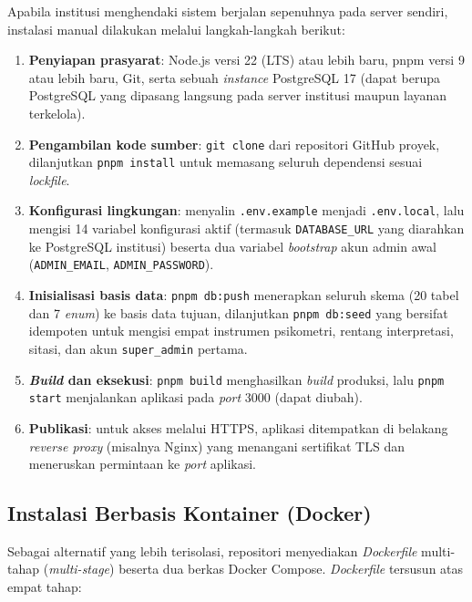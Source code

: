 Apabila institusi menghendaki sistem berjalan sepenuhnya pada server sendiri, instalasi manual dilakukan melalui langkah-langkah berikut:

\begin{enumerate}[leftmargin=2cm]
  \item \textbf{Penyiapan prasyarat}: Node.js versi 22 (LTS) atau lebih baru, pnpm versi 9 atau lebih baru, Git, serta sebuah \textit{instance} PostgreSQL 17 (dapat berupa PostgreSQL yang dipasang langsung pada server institusi maupun layanan terkelola).
  \item \textbf{Pengambilan kode sumber}: \texttt{git clone} dari repositori GitHub proyek, dilanjutkan \texttt{pnpm install} untuk memasang seluruh dependensi sesuai \textit{lockfile}.
  \item \textbf{Konfigurasi lingkungan}: menyalin \texttt{.env.example} menjadi \texttt{.env.local}, lalu mengisi 14 variabel konfigurasi aktif (termasuk \texttt{DATABASE\_URL} yang diarahkan ke PostgreSQL institusi) beserta dua variabel \textit{bootstrap} akun admin awal (\texttt{ADMIN\_EMAIL}, \texttt{ADMIN\_PASSWORD}).
  \item \textbf{Inisialisasi basis data}: \texttt{pnpm db:push} menerapkan seluruh skema (20 tabel dan 7 \textit{enum}) ke basis data tujuan, dilanjutkan \texttt{pnpm db:seed} yang bersifat idempoten untuk mengisi empat instrumen psikometri, rentang interpretasi, sitasi, dan akun \texttt{super\_admin} pertama.
  \item \textbf{\textit{Build} dan eksekusi}: \texttt{pnpm build} menghasilkan \textit{build} produksi, lalu \texttt{pnpm start} menjalankan aplikasi pada \textit{port} 3000 (dapat diubah).
  \item \textbf{Publikasi}: untuk akses melalui HTTPS, aplikasi ditempatkan di belakang \textit{reverse proxy} (misalnya Nginx) yang menangani sertifikat TLS dan meneruskan permintaan ke \textit{port} aplikasi.
\end{enumerate}

\subsection{Instalasi Berbasis Kontainer (Docker)}
\label{subsec:instalasi-docker}

Sebagai alternatif yang lebih terisolasi, repositori menyediakan \textit{Dockerfile} multi-tahap (\textit{multi-stage}) beserta dua berkas Docker Compose. \textit{Dockerfile} tersusun atas empat tahap:

